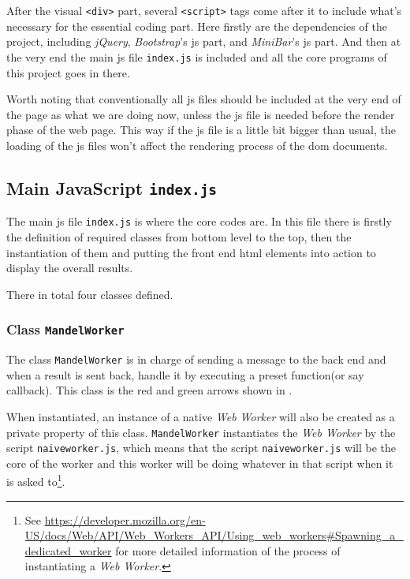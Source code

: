 After the visual \texttt{<div>} part, several \texttt{<script>} tags come after it to include what's necessary for the essential coding part. Here firstly are the dependencies of the project, including \emph{jQuery}, \emph{Bootstrap}'s \gls{js} part, and \emph{MiniBar}'s \gls{js} part. And then at the very end the main \gls{js} file \texttt{index.js} is included and all the core programs of this project goes in there.

Worth noting that conventionally all \gls{js} files should be included at the very end of the page as what we are doing now, unless the \gls{js} file is needed before the render phase of the web page. This way if the \gls{js} file is a little bit bigger than usual, the loading of the \gls{js} files won't affect the rendering process of the \gls{dom} documents.


\subsection{Main JavaScript \texttt{index.js}}

The main \gls{js} file \texttt{index.js} is where the core codes are. In this file there is firstly the definition of required classes from bottom level to the top, then the instantiation of them and putting the front end \gls{html} elements into action to display the overall results.

There in total four classes defined.

\subsubsection{Class \texttt{MandelWorker}}

The class \texttt{MandelWorker} is in charge of sending a message to the back end and when a result is sent back, handle it by executing a preset function(or say callback). This class is the red and green arrows shown in .

When instantiated, an instance of a native \emph{Web Worker} will also be created as a private property of this class. \texttt{MandelWorker} instantiates the \emph{Web Worker} by the script \texttt{naive\-worker.js}, which means that the script \texttt{naive\-worker.js} will be the core of the worker and this worker will be doing whatever in that script when it is asked to\footnote{ See \url{https://developer.mozilla.org/en-US/docs/Web/API/Web_Workers_API/Using_web_workers\#Spawning_a_dedicated_worker} for more detailed information of the process of instantiating a \emph{Web Worker}.}.

